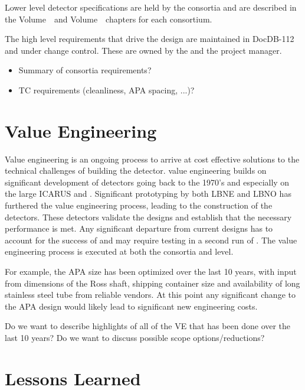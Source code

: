 Lower level detector specifications are held by the consortia and are
described in the   
Volume~\volnumbersp\ and  Volume~\volnumberdp\ chapters for
each consortium.

The high level  requirements that drive the  design are
maintained in DocDB-112 and under change control. These are owned by
the   and the  project manager.

\begin{itemize}
 \item Summary of consortia requirements?
 \item TC requirements (cleanliness, APA spacing, ...)?
\end{itemize}


\section{Value Engineering}
\label{sec:fdsp-coord-ve}

Value engineering is an ongoing process to arrive at cost effective
solutions to the technical challenges of building the 
detector.  value engineering builds on significant
development of  detectors going back to the 1970's and
especially on the large  ICARUS and
. Significant prototyping by both LBNE and LBNO has
furthered the value engineering process, leading to the construction
of the  detectors. These detectors validate the
 designs and establish that the necessary performance is
met. Any significant departure from current designs has to account for
the success of  and may require testing in a second
run of . The value engineering process is executed
at both the consortia and  level.

For example, the APA size has been optimized over the last 10 years,
with input from dimensions of the Ross shaft, shipping container size
and availability of long stainless steel tube from reliable vendors.
At this point any significant change to the APA design would likely
lead to significant new engineering costs.

Do we want to describe highlights of all of the VE that has been done
over the last 10 years? Do we want to discuss possible scope options/reductions?

\section{Lessons Learned}
\label{sec:fdsp-coord-lessons}

